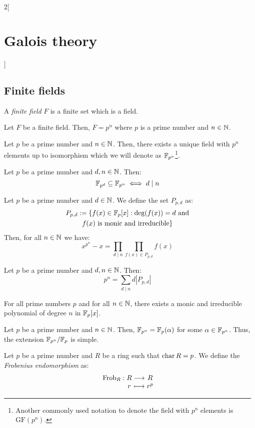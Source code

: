 \documentclass[../../../main.tex]{subfiles}
\begin{document}
\begin{multicols}{2}[\section{Galois theory}]
  \subsection{Finite fields}
  \begin{definition}
    A \emph{finite field} $F$ is a finite set which is a field.
  \end{definition}
  \begin{prop}
    Let $F$ be a finite field. Then, $F=p^n$ where $p$ is a prime number and $n\in\mathbb{N}$.
  \end{prop}
  \begin{theorem}
    Let $p$ be a prime number and $n\in\mathbb{N}$. Then, there exists a unique field with $p^n$ elements up to isomorphism which we will denote as $\mathbb{F}_{p^n}$\footnote{Another commonly used notation to denote the field with $p^n$ elements is $\text{GF}(p^n)$.}.
  \end{theorem}
  \begin{prop}
    Let $p$ be a prime number and $d,n\in\mathbb{N}$. Then: $$\mathbb{F}_{p^d}\subseteq\mathbb{F}_{p^n}\iff d\mid n$$
  \end{prop}
  \begin{theorem}
    Let $p$ be a prime number and $d\in\mathbb{N}$. We define the set $P_{p,d}$ as:
    \begin{multline*}
      P_{p,d}:=\{f(x)\in\mathbb{F}_p[x]:\deg(f(x))=d\text{ and}\\\text{$f(x)$ is monic and irreducible}\}
    \end{multline*}
    Then, for all $n\in\mathbb{N}$ we have: $$x^{p^n}-x=\prod_{d\mid n}\prod_{f(x)\in P_{p,d}}f(x)$$
  \end{theorem}
  \begin{corollary}
    Let $p$ be a prime number and $d,n\in\mathbb{N}$. Then: $$p^n=\sum_{d\mid n}d|P_{p,d}|$$
  \end{corollary}
  \begin{corollary}
    For all prime numbers $p$ and for all $n\in\mathbb{N}$, there exists a monic and irreducible polynomial of degree $n$ in $\mathbb{F}_p[x]$.
  \end{corollary}
  \begin{corollary}
    Let $p$ be a prime number and $n\in\mathbb{N}$. Then, $\mathbb{F}_{p^n}=\mathbb{F}_p(\alpha)$ for some $\alpha\in\mathbb{F}_{p^n}$. Thus, the extension $\quot{\FF_{p^n}}{\FF_p}$ is simple.
  \end{corollary}
  \begin{definition}
    Let $p$ be a prime number and $R$ be a ring such that $\operatorname{char} R=p$. We define the \emph{Frobenius endomorphism} as: $$\function{\text{Frob}_R}{R}{R}{r}{r^p}$$

\end{definition}
\end{multicols}
\end{document}
